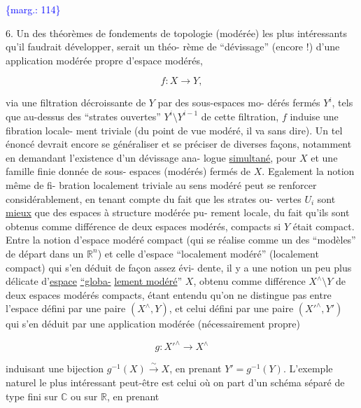 \documentclass[11pt]{article}
\newcommand{\scanpage}[1]{\par\bigskip\noindent{\small\sffamily[scan #1]}\par}
\newcommand{\mspage}[1]{{\small\sffamily[p.\,#1]}}
\newcommand{\margin}[1]{\textcolor{blue}{\{\textsf{marg.:} #1\}}}
\newcommand{\uline}[1]{\underline{#1}}
\begin{document}
\margin{114}

\clearpage
\scanpage{119/115}
\mspage{37}

6. Un des théorèmes de fondements de topologie (modérée)
les plus intéressants qu'il faudrait développer, serait un théo-%
rème de ``dévissage'' (encore !) d'une application modérée propre
d'espace modérés,

\[ f : X \longrightarrow Y , \]

via une filtration décroissante de $Y$ par des sous-espaces mo-%
dérés fermés $Y^{i}$, tels que au-dessus des ``strates ouvertes''
$Y^{i} \setminus Y^{i-1}$ de cette filtration, $f$ induise une fibration locale-%
ment triviale (du point de vue modéré, il va sans dire). Un tel
énoncé devrait encore se généraliser et se préciser de diverses
façons, notamment en demandant l'existence d'un dévissage ana-%
logue \uline{simultané}, pour $X$ et une famille finie donnée de sous-%
espaces (modérés) fermés de $X$. Egalement la notion même de fi-%
bration localement triviale au sens modéré peut se renforcer
considérablement, en tenant compte du fait que les strates ou-%
vertes $U_{i}$ sont \uline{mieux} que des espaces à structure modérée pu-%
rement locale, du fait qu'ils sont obtenus comme différence de
deux espaces modérés, compacts si $Y$ était compact. Entre la
notion d'espace modéré compact (qui se réalise comme un des
``modèles'' de départ dans un $\mathbb{R}^{n}$) et celle d'espace ``localement
modéré'' (localement compact) qui s'en déduit de façon assez évi-%
dente, il y a une notion un peu plus délicate d'\uline{espace} \uline{``globa-}%
\uline{lement modéré}'' $X$, obtenu comme différence $X^{\wedge}\setminus Y$ de deux espaces
modérés compacts, étant entendu qu'on ne distingue pas entre
l'espace défini par une paire $(X^{\wedge},Y)$, et celui défini par une
paire $(X'^{\wedge},Y')$ qui s'en déduit par une application modérée
(nécessairement propre)

\[ g : X'^{\wedge} \longrightarrow X^{\wedge} \]

induisant une bijection $g^{-1}(X) \xrightarrow{\ \sim\ } X$, en prenant $Y' = g^{-1}(Y)$.
L'exemple naturel le plus intéressant peut-être est celui où on
part d'un schéma séparé de type fini sur $\mathbb{C}$ ou sur $\mathbb{R}$, en prenant
\end{document}
